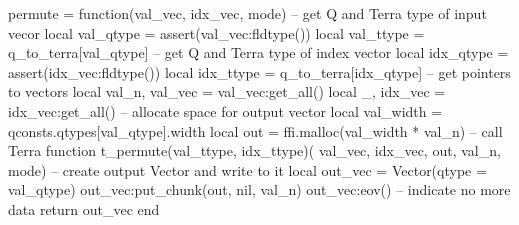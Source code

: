 permute = function(val_vec, idx_vec, mode)
  -- get Q and Terra type of input vecor
  local val_qtype = assert(val_vec:fldtype())
  local val_ttype = q_to_terra[val_qtype]  
  -- get Q and Terra type of index vector
  local idx_qtype = assert(idx_vec:fldtype())
  local idx_ttype = q_to_terra[idx_qtype]  
  -- get pointers to vectors
  local val_n, val_vec = val_vec:get_all()
  local     _, idx_vec = idx_vec:get_all()
  -- allocate space for output vector
  local val_width = qconsts.qtypes[val_qtype].width
  local out = ffi.malloc(val_width * val_n)
  -- call Terra function
  t_permute(val_ttype, idx_ttype)(
    val_vec, idx_vec, out, val_n, mode)
  -- create output Vector and write to it
  local out_vec = Vector({qtype = val_qtype})
  out_vec:put_chunk(out, nil, val_n) 
  out_vec:eov() -- indicate no more data
  return out_vec
end
